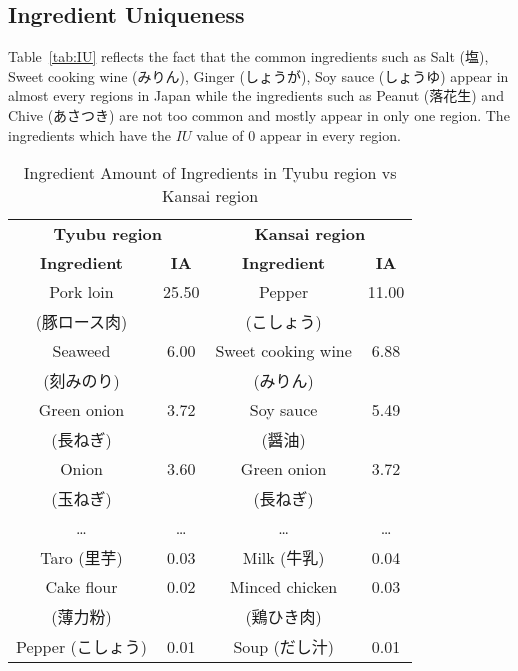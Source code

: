 \begin{CJK}{UTF8}{min}
\subsection{Ingredient Uniqueness}
\begin{CJK}{UTF8}{min}

Table~\ref{tab:IU} reflects the fact that the common ingredients such as Salt (塩), Sweet cooking wine (みりん), Ginger (しょうが), Soy sauce (しょうゆ) appear in almost every regions in Japan while the ingredients such as Peanut (落花生) and Chive (あさつき) are not too common and mostly appear in only one region. The ingredients which have the $IU$ value of 0 appear in every region.


\begin{table}
\centering
\caption{Ingredient Amount of Ingredients in Tyubu region vs Kansai region}
\begin{tabular}{|c|c|c|c|}
\hline
\multicolumn{2}{|c|}{\textbf{\large Tyubu region}} & \multicolumn{2}{|c|}{\textbf{\large Kansai region}} \\
\cline{1-4}

\textbf{Ingredient} &\textbf{ IA} & \textbf{Ingredient} & \textbf{IA}\\ \hline
Pork loin 	&	25.50 	& Pepper 	&11.00\\ 
 (豚ロース肉) & & (こしょう) & \\ \hline
Seaweed 		&	6.00		& Sweet cooking wine 		&6.88\\ 
(刻みのり) & & (みりん) & \\ \hline
Green onion 	&	3.72		& Soy sauce 	& 5.49\\ 
 (長ねぎ)	 & & (醤油)	 & \\ \hline
Onion		&	3.60		& Green onion 		&3.72\\ 
 (玉ねぎ) & & (長ねぎ) & \\ \hline
\ldots &\ldots & \ldots & \ldots \\ \hline
Taro (里芋)			&	0.03		& Milk (牛乳)		&0.04\\ \hline
Cake flour	&	0.02		& Minced chicken		&0.03\\ 
 (薄力粉)	 & &  (鶏ひき肉) & \\ \hline
Pepper (こしょう)		&	0.01		& Soup (だし汁)		&0.01\\ \hline

\end{tabular}

\label{tab:IAoutlier}
\end{table} 
\end{CJK}



\end{CJK}
